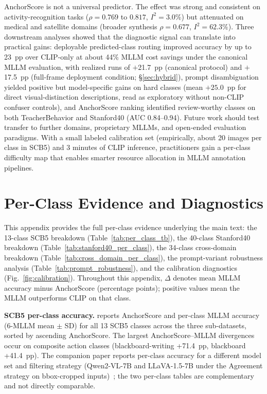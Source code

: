 \documentclass[11pt,a4paper]{article}
\begin{document}
AnchorScore is not a universal predictor. The effect was strong and consistent on activity-recognition tasks ($\rho=0.769$ to $0.817$, $I^2=3.0\%$) but attenuated on medical and satellite domains (broader synthesis $\rho=0.677$, $I^2=62.3\%$). Three downstream analyses showed that the diagnostic signal can translate into practical gains: deployable predicted-class routing improved accuracy by up to 23~pp over CLIP-only at about 44\% MLLM cost savings under the canonical MLLM evaluation, with realized runs of $+$21.7~pp (canonical protocol) and $+$17.5~pp (full-frame deployment condition; \S\ref{sec:hybrid}), prompt disambiguation yielded positive but model-specific gains on hard classes (mean $+25.0$~pp for direct visual-distinction descriptions, read as exploratory without non-CLIP confuser controls), and AnchorScore ranking identified review-worthy classes on both TeacherBehavior and Stanford40 (AUC 0.84--0.94). Future work should test transfer to further domains, proprietary MLLMs, and open-ended evaluation paradigms. With a small labeled calibration set (empirically, about 20 images per class in SCB5) and 3 minutes of CLIP inference, practitioners gain a per-class difficulty map that enables smarter resource allocation in MLLM annotation pipelines.



\appendix
\setcounter{figure}{0}
\renewcommand{\thefigure}{A\arabic{figure}}
\setcounter{table}{0}
\renewcommand{\thetable}{A\arabic{table}}
\clearpage
\section{Per-Class Evidence and Diagnostics}
\label{app:materials}

This appendix provides the full per-class evidence underlying the main text: the 13-class SCB5 breakdown (Table~\ref{tab:per_class_tb}), the 40-class Stanford40 breakdown (Table~\ref{tab:stanford40_per_class}), the 34-class cross-domain breakdown (Table~\ref{tab:cross_domain_per_class}), the prompt-variant robustness analysis (Table~\ref{tab:prompt_robustness}), and the calibration diagnostics (Fig.~\ref{fig:calibration}). Throughout this appendix, $\Delta$ denotes mean MLLM accuracy minus AnchorScore (percentage points); positive values mean the MLLM outperforms CLIP on that class.

\textbf{SCB5 per-class accuracy.}  reports AnchorScore and per-class MLLM accuracy (6-MLLM mean $\pm$ SD) for all 13 SCB5 classes across the three sub-datasets, sorted by ascending AnchorScore. The largest AnchorScore--MLLM divergences occur on composite action classes (blackboard-writing +71.4~pp, blackboard +41.4~pp). The companion paper reports per-class accuracy for a different model set and filtering strategy (Qwen2-VL-7B and LLaVA-1.5-7B under the Agreement strategy on bbox-cropped inputs)~\cite{ma2026agreement}; the two per-class tables are complementary and not directly comparable.
\end{document}
